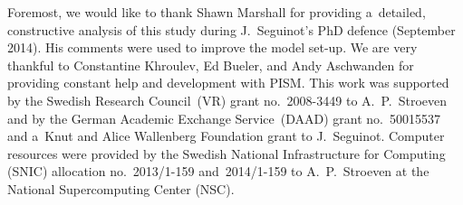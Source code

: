 \documentclass[tc, manuscript]{copernicus}
\begin{document}
\begin{acknowledgements}
      Foremost, we would like to thank Shawn Marshall for providing
      a~detailed, constructive analysis of this study during J.~Seguinot's
      PhD defence (September 2014). His comments were used to improve the
      model set-up. We are very thankful to Constantine Khroulev, Ed Bueler,
      and Andy Aschwanden for providing constant help and development with
      PISM. This work was supported by the Swedish Research Council~(VR)
      grant no.~2008-3449 to A.~P.~Stroeven and by the German Academic
      Exchange Service~(DAAD) grant no.~50015537 and a~Knut and Alice
      Wallenberg Foundation grant to J.~Seguinot. Computer resources were
      provided by the Swedish National Infrastructure for Computing (SNIC)
      allocation no.~2013/1-159 and~2014/1-159 to A.~P.~Stroeven at the
      National Supercomputing Center (NSC).
\end{acknowledgements}
\end{document}
